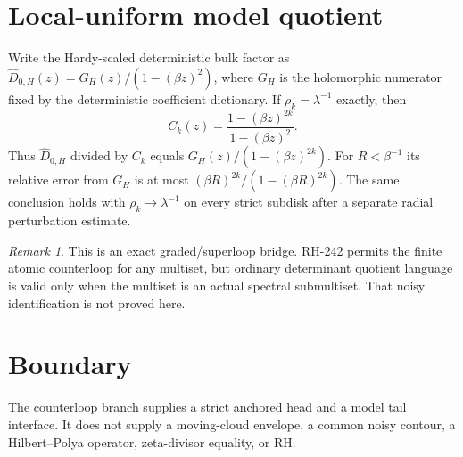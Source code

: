\documentclass[11pt]{article}
\theoremstyle{remark}\newtheorem{remark}[theorem]{Remark}
\begin{document}
\section{Local-uniform model quotient}
Write the Hardy-scaled deterministic bulk factor as
$\widehat D_{0,H}(z)=G_H(z)/(1-(\beta z)^2)$, where $G_H$ is the
holomorphic numerator fixed by the deterministic coefficient dictionary.
If $\rho_k=\lambda^{-1}$ exactly, then
\[
 C_k(z)=\frac{1-(\beta z)^{2k}}{1-(\beta z)^2}.
\]
Thus $\widehat D_{0,H}$ divided by $C_k$ equals
$G_H(z)/(1-(\beta z)^{2k})$.  For $R<\beta^{-1}$ its relative error from
$G_H$ is at most $(\beta R)^{2k}/(1-(\beta R)^{2k})$.
The same conclusion holds with $\rho_k\to\lambda^{-1}$ on every strict
subdisk after a separate radial perturbation estimate.
\begin{remark}
This is an exact graded/superloop bridge.  RH-242 permits the finite atomic
counterloop for any multiset, but ordinary determinant quotient language is
valid only when the multiset is an actual spectral submultiset.  That noisy
identification is not proved here.
\end{remark}
\section{Boundary}
The counterloop branch supplies a strict anchored head and a model tail
interface.  It does not supply a moving-cloud envelope, a common noisy
contour, a Hilbert--Polya operator, zeta-divisor equality, or RH.
\end{document}
